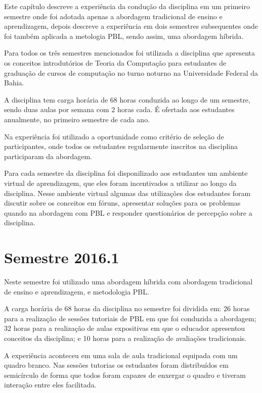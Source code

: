 \label{cap-experiencia}
\acresetall

Este capítulo descreve a experiência da condução da disciplina em um primeiro
semestre onde foi adotada apenas a abordagem tradicional de ensino e aprendizagem,
depois descreve a experiência em dois semestres subsequentes onde foi também aplicada a metologia PBL,
sendo assim, uma abordagem híbrida.

Para todos os três semestres mencionados foi utilizada a disciplina que apresenta os
conceitos introdutórios de Teoria da Computação para estudantes de graduação de cursos de computação
no turno noturno na Universidade Federal da Bahia.

A disciplina tem carga horária de 68 horas conduzida ao longo de um semestre, sendo duas
aulas por semana com 2 horas cada.
É ofertada aos estudantes anualmente, no primeiro semestre de cada ano.

Na experiência foi utilizado a oportunidade como critério de seleção de participantes, onde todos os
estudantes regularmente inscritos na disciplina participaram da abordagem.

Para cada semestre da disciplina foi disponilizado aos estudantes um ambiente virtual de aprendizagem,
que eles foram incentivados a utilizar ao longo da disciplina.
Nesse ambiente virtual algumas das utilizações dos estudantes foram discutir sobre os conceitos
em fóruns, apresentar soluções para os problemas quando na abordagem com PBL e responder
questionários de percepção sobre a disciplina.

\section{Semestre 2016.1}

Neste semestre foi utilizado uma abordagem híbrida com abordagem tradicional de ensino
e aprendizagem, e metodologia PBL.

A carga horária de 68 horas da disciplina no semestre foi dividida em:
26 horas para a realização de sessões tutoriais de PBL em que foi conduzida a abordagem;
32 horas para a realização de aulas expositivas em que o educador apresentou conceitos da disciplina;
e 10 horas para a realização de avaliações tradicionais.

A experiência aconteceu em uma sala de aula tradicional equipada com um
quadro branco.
Nas sessões tutorias os estudantes foram distribuídos em semicírculo de forma que todos foram capazes de
enxergar o quadro e tiveram interação entre eles facilitada.

